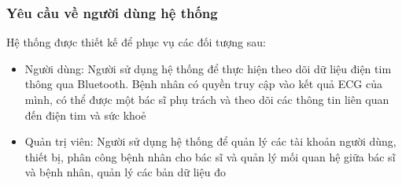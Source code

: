 \subsubsection{Yêu cầu về người dùng hệ thống}
Hệ thống được thiết kế để phục vụ các đối tượng sau:
\begin{adjustwidth}{1.5em}{}
\begin{itemize}
    \item Người dùng: Người sử dụng hệ thống để thực hiện theo dõi dữ liệu điện tim thông qua Bluetooth. Bệnh nhân có quyền truy cập vào kết quả ECG của mình, có thể được một bác sĩ phụ trách và theo dõi các thông tin liên quan đến điện tim và sức khoẻ
    \item Quản trị viên: Người sử dụng hệ thống để quản lý các tài khoản người dùng, thiết bị, phân công bệnh nhân cho bác sĩ và quản lý mối quan hệ giữa bác sĩ và bệnh nhân, quản lý các bản dữ liệu đo
\end{itemize}
\end{adjustwidth}

